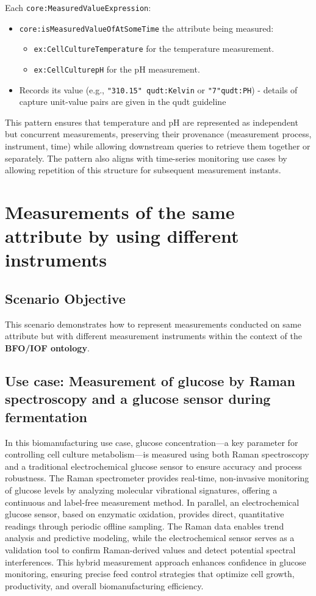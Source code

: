 Each \texttt{core:MeasuredValueExpression}:

\begin{itemize}
    \item \texttt{core:isMeasuredValueOfAtSomeTime} the attribute being measured:
    \begin{itemize}
        \item \texttt{ex:CellCultureTemperature} for the temperature measurement.
        \item \texttt{ex:CellCulturepH} for the pH measurement.
    \end{itemize}
    \item Records its value (e.g., \texttt{"310.15" qudt:Kelvin} or \texttt{"7"qudt:PH}) - details of capture unit-value pairs are given in the qudt guideline
\end{itemize}

This pattern ensures that temperature and pH are represented as independent but concurrent measurements, preserving their provenance (measurement process, instrument, time) while allowing downstream queries to retrieve them together or separately. The pattern also aligns with time-series monitoring use cases by allowing repetition of this structure for subsequent measurement instants.


\section{Measurements of the same attribute by using different instruments}

\subsection*{Scenario Objective}

This scenario demonstrates how to represent measurements conducted on same attribute but with different measurement instruments within the context of the \textbf{BFO/IOF ontology}.
\subsection{Use case: Measurement of glucose by Raman spectroscopy and a glucose sensor during fermentation}
In this biomanufacturing use case, glucose concentration—a key parameter for controlling cell culture metabolism—is measured using both Raman spectroscopy and a traditional electrochemical glucose sensor to ensure accuracy and process robustness. The Raman spectrometer provides real-time, non-invasive monitoring of glucose levels by analyzing molecular vibrational signatures, offering a continuous and label-free measurement method. In parallel, an electrochemical glucose sensor, based on enzymatic oxidation, provides direct, quantitative readings through periodic offline sampling. The Raman data enables trend analysis and predictive modeling, while the electrochemical sensor serves as a validation tool to confirm Raman-derived values and detect potential spectral interferences. 
This hybrid measurement approach enhances confidence in glucose monitoring, ensuring precise feed control strategies that optimize cell growth, productivity, and overall biomanufacturing efficiency.